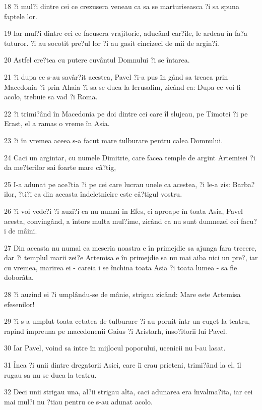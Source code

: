 \par 18 ?i mul?i dintre cei ce crezusera veneau ca sa se marturiseasca ?i sa spuna faptele lor.
\par 19 Iar mul?i dintre cei ce facusera vrajitorie, aducând car?ile, le ardeau în fa?a tuturor. ?i au socotit pre?ul lor ?i au gasit cincizeci de mii de argin?i.
\par 20 Astfel cre?tea cu putere cuvântul Domnului ?i se întarea.
\par 21 ?i dupa ce s-au savâr?it acestea, Pavel ?i-a pus în gând sa treaca prin Macedonia ?i prin Ahaia ?i sa se duca la Ierusalim, zicând ca: Dupa ce voi fi acolo, trebuie sa vad ?i Roma.
\par 22 ?i trimi?ând în Macedonia pe doi dintre cei care îl slujeau, pe Timotei ?i pe Erast, el a ramas o vreme în Asia.
\par 23 ?i în vremea aceea s-a facut mare tulburare pentru calea Domnului.
\par 24 Caci un argintar, cu numele Dimitrie, care facea temple de argint Artemisei ?i da me?terilor sai foarte mare câ?tig,
\par 25 I-a adunat pe ace?tia ?i pe cei care lucrau unele ca acestea, ?i le-a zis: Barba?ilor, ?ti?i ca din aceasta îndeletnicire este câ?tigul vostru.
\par 26 ?i voi vede?i ?i auzi?i ca nu numai în Efes, ci aproape în toata Asia, Pavel acesta, convingând, a întors multa mul?ime, zicând ca nu sunt dumnezei cei facu?i de mâini.
\par 27 Din aceasta nu numai ca meseria noastra e în primejdie sa ajunga fara trecere, dar ?i templul marii zei?e Artemisa e în primejdie sa nu mai aiba nici un pre?, iar cu vremea, marirea ei - careia i se închina toata Asia ?i toata lumea - sa fie doborâta.
\par 28 ?i auzind ei ?i umplându-se de mânie, strigau zicând: Mare este Artemisa efesenilor!
\par 29 ?i s-a umplut toata cetatea de tulburare ?i au pornit într-un cuget la teatru, rapind împreuna pe macedonenii Gaius ?i Aristarh, înso?itorii lui Pavel.
\par 30 Iar Pavel, voind sa intre în mijlocul poporului, ucenicii nu l-au lasat.
\par 31 Înca ?i unii dintre dregatorii Asiei, care îi erau prieteni, trimi?ând la el, îl rugau sa nu se duca la teatru.
\par 32 Deci unii strigau una, al?ii strigau alta, caci adunarea era învalma?ita, iar cei mai mul?i nu ?tiau pentru ce s-au adunat acolo.
